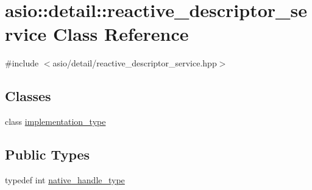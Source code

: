 \hypertarget{classasio_1_1detail_1_1reactive__descriptor__service}{}\section{asio\+:\+:detail\+:\+:reactive\+\_\+descriptor\+\_\+service Class Reference}
\label{classasio_1_1detail_1_1reactive__descriptor__service}


{\ttfamily \#include $<$asio/detail/reactive\+\_\+descriptor\+\_\+service.\+hpp$>$}

\subsection*{Classes}
\begin{DoxyCompactItemize}
\item 
class \hyperlink{classasio_1_1detail_1_1reactive__descriptor__service_1_1implementation__type}{implementation\+\_\+type}
\end{DoxyCompactItemize}
\subsection*{Public Types}
\begin{DoxyCompactItemize}
\item 
typedef int \hyperlink{classasio_1_1detail_1_1reactive__descriptor__service_af59f442d3eb8d39ffa9e7787b9fb0731}{native\+\_\+handle\+\_\+type}
\end{DoxyCompactItemize}
